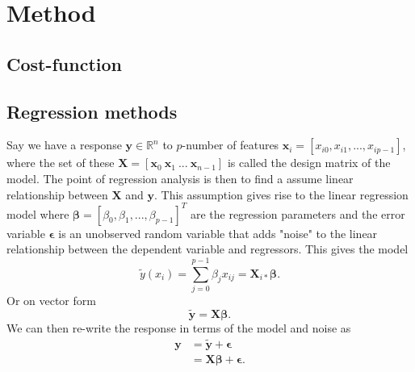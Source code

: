 \section{Method}

\begin{comment}
	Describe the methods and algorithms. You need to
	explain how you implemented the methods and also
	say something about the structure of your algorithm
	and present some parts of your code. You should
	plug in some calculations to demonstrate your code,
	such as selected runs used to validate and verify your
	results. The latter is extremely important! A reader
	needs to understand that your code reproduces selected
	benchmarks and reproduces previous results, either
	numerical and/or well-known closed form expressions.
\end{comment}

\subsection{Cost-function}


\subsection{Regression methods}
Say we have a response $\mathbf{y}\in\mathbb{R}^n$ to $p$-number of features $\mathbf{x}_i=[x_{i0}, x_{i1},...,x_{ip-1}]$,
where the set of these $\mathbf{X}=[\mathbf{x}_{0}\ \mathbf{x}_{1}\ ...\ \mathbf{x}_{n-1}]$ is called the design matrix of the model. 
The point of regression analysis is then to find a assume linear relationship between $\mathbf{X}$ and $\mathbf{y}$. 
This assumption gives rise to the linear regression model where $\boldsymbol\beta=\left[\beta_0, \beta_1, ..., \beta_{p-1} \right]^T$ 
are the regression parameters and the error variable $\boldsymbol\epsilon$ is an unobserved random variable that adds 
"noise" to the linear relationship between the dependent variable and regressors. This gives the model
\begin{equation*}
	\tilde{y}(x_i) = \sum_{j=0}^{p-1} \beta_j x_{ij}=\mathbf X_{i*}\boldsymbol{\beta}.
\end{equation*}
Or on vector form
\begin{equation*}
\boldsymbol{\tilde y} = \mathbf{X}\boldsymbol\beta.
\end{equation*}
We can then re-write the response in terms of the model and noise as
\begin{align*}
\label{eq:linear_regression}
    \mathbf{y} 
	&=\boldsymbol{\tilde y} + \boldsymbol{\epsilon}\\
	&=\mathbf{X}\boldsymbol{\beta} + \boldsymbol{\epsilon}.
\end{align*}




